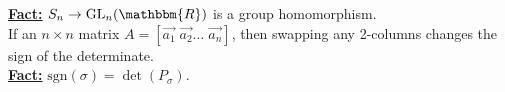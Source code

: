 \documentclass{article}
\newcommand{\R}{\mathbbm{R}}
\newcommand{\define}[1]{\textbf{\underline{#1}}}
\theoremstyle{definition}
\theoremstyle{remark}
\newcommand{\sgn}{\mathrm{sgn}}
\begin{document}
{{            \noindent \define{Fact:} $S_n \to \mathrm{GL}_n(\R)$ is a group homomorphism.\\
            
            \noindent If an $n\times n$ matrix $A=[\Vec{a_1}\;\Vec{a_2}\ldots\;\Vec{a_n}]$, then swapping any 2-columns changes the sign of the determinate.\\
        
            \noindent\define{Fact:} $\sgn(\sigma)=\det(P_\sigma)$.
        }
    }
\end{document}

